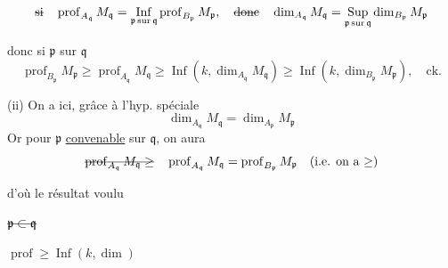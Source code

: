 \[
\deleted{\text{si}}\quad \operatorname{prof}_{A_{\mathfrak q}} M_{\mathfrak q}=\mathop{\mathrm{Inf}}_{\mathfrak p\,\mathrm{sur}\,\mathfrak q}\operatorname{prof}_{B_{\mathfrak p}}M_{\mathfrak p},\quad
\deleted{\text{donc}}\quad \dim_{A_{\mathfrak q}}M_{\mathfrak q}=\mathop{\mathrm{Sup}}_{\mathfrak p\,\mathrm{sur}\,\mathfrak q}\dim_{B_{\mathfrak p}}M_{\mathfrak p}
\]

donc si $\mathfrak p$ sur $\mathfrak q$
\[
\operatorname{prof}_{B_{\mathfrak p}}M_{\mathfrak p}\geq\operatorname{prof}_{A_{\mathfrak q}}M_{\mathfrak q}\geq\operatorname{Inf}(k,\dim_{A_{\mathfrak q}}M_{\mathfrak q})\geq\operatorname{Inf}(k,\dim_{B_{\mathfrak p}}M_{\mathfrak p}),\quad\text{ck.}
\]

(ii) On a ici, grâce à l'hyp. spéciale
\[
\dim_{A_{\mathfrak q}}M_{\mathfrak q}=\dim_{A_{\mathfrak p}}M_{\mathfrak p}
\]
Or pour $\mathfrak p$ \uline{convenable} sur $\mathfrak q$, on aura 
\[
\deleted{\operatorname{prof}_{A_{\mathfrak q}}M_{\mathfrak q}\geq}\quad \operatorname{prof}_{A_{\mathfrak q}}M_{\mathfrak q}=\operatorname{prof}_{B_{\mathfrak p}}M_{\mathfrak p}\quad(\text{i.e. on a }{\geq})
\]

 d'où le résultat voulu \textendash\ \textendash\ \textendash\ \textendash

$\deleted{\mathfrak p\subset\mathfrak q}$


$\operatorname{prof}\geq\operatorname{Inf}(k,\dim)$



